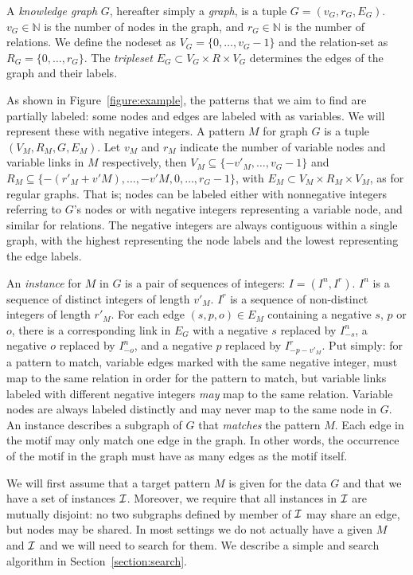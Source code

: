 \documentclass[letterpaper]{article} %
\newcommand{\N}{{\mathbb N}}
\newcommand{\I}{{\cal I}}
\begin{document}
A \emph{knowledge graph} $G$, hereafter simply a \emph{graph}, is a tuple $G = (v_G, r_G, E_G)$. $v_G \in \N$ is the number of nodes in the graph, and $r_G \in \N$ is the number of relations. We define the nodeset as $V_G = \{0, \ldots, v_G-1\}$ and the relation-set as $R_G = \{0, \ldots, r_G\}$. The \emph{tripleset} $E_G \subset V_G \times R \times V_G$ determines the edges of the graph and their labels. 

As shown in Figure~\ref{figure:example}, the patterns that we aim to find are partially labeled: some nodes and edges are labeled with as variables. We will represent these with negative integers. A pattern $M$ for graph $G$ is a tuple $(V_M, R_M, G, E_M)$. Let $v_M$ and $r_M$ indicate the number of variable nodes and variable links in $M$ respectively, then $V_M \subseteq \{-v'_M, \ldots, v_G-1\}$ and $R_M \subseteq \{-(r'_M+v'M), \ldots,-v'M, 0,\ldots, r_G-1\}$, with $E_M \subset V_M \times R_M \times V_M$, as for regular graphs. That is; nodes can be labeled either with nonnegative integers referring to $G$'s nodes or with negative integers representing a variable node, and similar for relations. The negative integers are always contiguous within a single graph, with the highest representing the node labels and the lowest representing the edge labels.

An \emph{instance} for $M$ in $G$ is a pair of sequences of integers: $I = (I^n, I^r)$. $I^n$ is a sequence of distinct integers of length $v'_M$. $I^r$ is a sequence of non-distinct integers of length $r'_M$. For each edge $(s, p, o) \in E_M$ containing a negative $s$, $p$ or $o$, there is a corresponding link in $E_G$ with a negative $s$ replaced by $I^n_{-s}$, a negative $o$ replaced by $I^n_{-o}$, and a negative $p$ replaced by $I^r_{-p - v'_M}$. Put simply: for a pattern to match, variable edges marked with the same negative integer, must map to the same relation in order for the pattern to match, but variable links labeled with different negative integers \emph{may} map to the same relation. Variable nodes are always labeled distinctly and may never map to the same node in $G$. An instance describes a subgraph of $G$ that \emph{matches} the pattern $M$. Each edge in the motif may only match one edge in the graph. In other words, the occurrence of the motif in the graph must have as many edges as the motif itself.

We will first assume that a target pattern $M$ is given for the data $G$ and that we have a set of instances $\I$. Moreover, we require that all instances in $\I$ are mutually disjoint: no two subgraphs defined by member of $\I$ may share an edge, but nodes may be shared. In most settings we do not actually have a given $M$ and $\I$ and we will need to search for them. We describe a simple and search algorithm in Section~\ref{section:search}.
\end{document}
